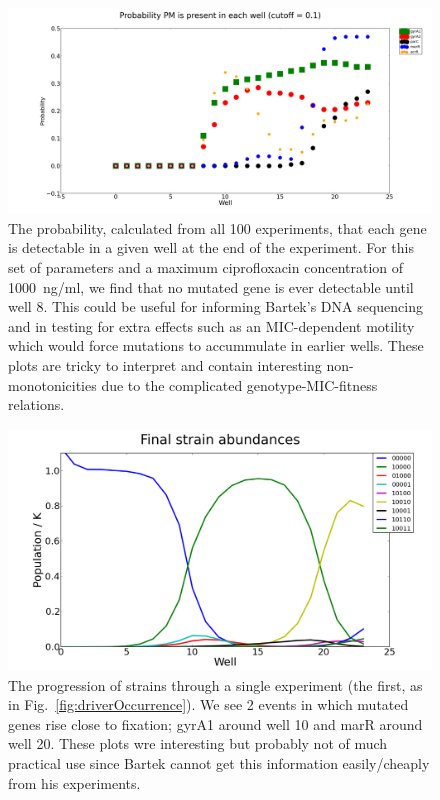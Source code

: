 \documentclass[a4paper,10pt]{article}
\begin{document}
 \begin{figure}
  \centering
  \includegraphics[width=0.95\linewidth]{gene_probabilities}
\caption{The probability, calculated from all 100 experiments, that each gene is detectable in a given well at the end of the experiment.
For this set of parameters and a maximum ciprofloxacin concentration of 1000~ng/ml, we find that no mutated gene is ever detectable until well 8.
This could be useful for informing Bartek's DNA sequencing and in testing for extra effects such as an MIC-dependent motility which would force
mutations to accummulate in earlier wells.
These plots are tricky to interpret and contain interesting non-monotonicities due to the complicated genotype-MIC-fitness relations.}
\label{fig:driverProbability}
\end{figure}



  \begin{figure}
  \centering
  \includegraphics[width=0.95\linewidth]{Strains_Experiment_0}
\caption{The progression of strains through a single experiment (the first, as in Fig.~\ref{fig:driverOccurrence}). We see 2 events in which
mutated genes rise close to fixation; gyrA1 around well 10 and marR around well 20. These plots wre interesting but probably not of much practical use
since Bartek cannot get this information easily/cheaply from his experiments.}
\label{fig:strainOccurrence}
\end{figure}
\end{document}
